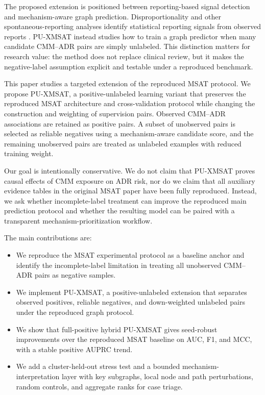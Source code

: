 \documentclass[manuscript,screen,review]{acmart}
\newcommand{\msat}{MSAT}
\newcommand{\px}{PU-XMSAT}
\begin{document}
The proposed extension is positioned between reporting-based signal detection and mechanism-aware graph prediction. Disproportionality and other spontaneous-reporting analyses identify statistical reporting signals from observed reports \cite{bate2009quantitative,harpaz2012novel}. \px{} instead studies how to train a graph predictor when many candidate CMM--ADR pairs are simply unlabeled. This distinction matters for research value: the method does not replace clinical review, but it makes the negative-label assumption explicit and testable under a reproduced benchmark.

This paper studies a targeted extension of the reproduced \msat{} protocol. We propose \px{}, a positive-unlabeled learning variant that preserves the reproduced \msat{} architecture and cross-validation protocol while changing the construction and weighting of supervision pairs. Observed CMM--ADR associations are retained as positive pairs. A subset of unobserved pairs is selected as reliable negatives using a mechanism-aware candidate score, and the remaining unobserved pairs are treated as unlabeled examples with reduced training weight.

Our goal is intentionally conservative. We do not claim that \px{} proves causal effects of CMM exposure on ADR risk, nor do we claim that all auxiliary evidence tables in the original \msat{} paper have been fully reproduced. Instead, we ask whether incomplete-label treatment can improve the reproduced main prediction protocol and whether the resulting model can be paired with a transparent mechanism-prioritization workflow.

The main contributions are:
\begin{itemize}
  \item We reproduce the \msat{} experimental protocol as a baseline anchor and identify the incomplete-label limitation in treating all unobserved CMM--ADR pairs as negative samples.
  \item We implement \px{}, a positive-unlabeled extension that separates observed positives, reliable negatives, and down-weighted unlabeled pairs under the reproduced graph protocol.
  \item We show that full-positive hybrid \px{} gives seed-robust improvements over the reproduced \msat{} baseline on AUC, F1, and MCC, with a stable positive AUPRC trend.
  \item We add a cluster-held-out stress test and a bounded mechanism-interpretation layer with key subgraphs, local node and path perturbations, random controls, and aggregate ranks for case triage.
\end{itemize}
\end{document}
